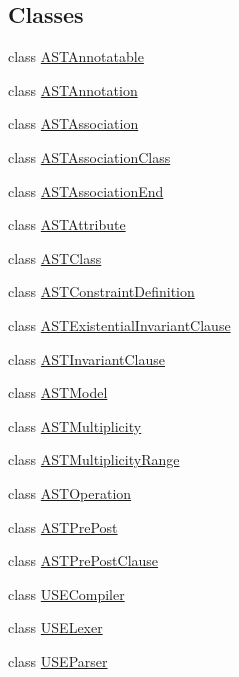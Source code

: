 \subsection*{Classes}
\begin{DoxyCompactItemize}
\item 
class \hyperlink{classorg_1_1tzi_1_1use_1_1parser_1_1use_1_1_a_s_t_annotatable}{A\-S\-T\-Annotatable}
\item 
class \hyperlink{classorg_1_1tzi_1_1use_1_1parser_1_1use_1_1_a_s_t_annotation}{A\-S\-T\-Annotation}
\item 
class \hyperlink{classorg_1_1tzi_1_1use_1_1parser_1_1use_1_1_a_s_t_association}{A\-S\-T\-Association}
\item 
class \hyperlink{classorg_1_1tzi_1_1use_1_1parser_1_1use_1_1_a_s_t_association_class}{A\-S\-T\-Association\-Class}
\item 
class \hyperlink{classorg_1_1tzi_1_1use_1_1parser_1_1use_1_1_a_s_t_association_end}{A\-S\-T\-Association\-End}
\item 
class \hyperlink{classorg_1_1tzi_1_1use_1_1parser_1_1use_1_1_a_s_t_attribute}{A\-S\-T\-Attribute}
\item 
class \hyperlink{classorg_1_1tzi_1_1use_1_1parser_1_1use_1_1_a_s_t_class}{A\-S\-T\-Class}
\item 
class \hyperlink{classorg_1_1tzi_1_1use_1_1parser_1_1use_1_1_a_s_t_constraint_definition}{A\-S\-T\-Constraint\-Definition}
\item 
class \hyperlink{classorg_1_1tzi_1_1use_1_1parser_1_1use_1_1_a_s_t_existential_invariant_clause}{A\-S\-T\-Existential\-Invariant\-Clause}
\item 
class \hyperlink{classorg_1_1tzi_1_1use_1_1parser_1_1use_1_1_a_s_t_invariant_clause}{A\-S\-T\-Invariant\-Clause}
\item 
class \hyperlink{classorg_1_1tzi_1_1use_1_1parser_1_1use_1_1_a_s_t_model}{A\-S\-T\-Model}
\item 
class \hyperlink{classorg_1_1tzi_1_1use_1_1parser_1_1use_1_1_a_s_t_multiplicity}{A\-S\-T\-Multiplicity}
\item 
class \hyperlink{classorg_1_1tzi_1_1use_1_1parser_1_1use_1_1_a_s_t_multiplicity_range}{A\-S\-T\-Multiplicity\-Range}
\item 
class \hyperlink{classorg_1_1tzi_1_1use_1_1parser_1_1use_1_1_a_s_t_operation}{A\-S\-T\-Operation}
\item 
class \hyperlink{classorg_1_1tzi_1_1use_1_1parser_1_1use_1_1_a_s_t_pre_post}{A\-S\-T\-Pre\-Post}
\item 
class \hyperlink{classorg_1_1tzi_1_1use_1_1parser_1_1use_1_1_a_s_t_pre_post_clause}{A\-S\-T\-Pre\-Post\-Clause}
\item 
class \hyperlink{classorg_1_1tzi_1_1use_1_1parser_1_1use_1_1_u_s_e_compiler}{U\-S\-E\-Compiler}
\item 
class \hyperlink{classorg_1_1tzi_1_1use_1_1parser_1_1use_1_1_u_s_e_lexer}{U\-S\-E\-Lexer}
\item 
class \hyperlink{classorg_1_1tzi_1_1use_1_1parser_1_1use_1_1_u_s_e_parser}{U\-S\-E\-Parser}
\end{DoxyCompactItemize}
